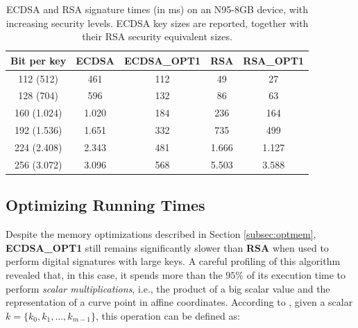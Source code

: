 \documentclass[authoryear]{elsarticle}
\begin{document}

\begin{table}[ht]
\caption{ECDSA and RSA signature times (in ms) on an N95-8GB device, with increasing security levels. ECDSA key sizes are reported, together with their RSA security equivalent sizes.}
\centering %
\begin{tabular}{|c|c|c|c|c|} %
\hline\hline %
Bit per key & ECDSA & ECDSA\_OPT1 & RSA & RSA\_OPT1\\
\hline\hline %
112 (512) & 461 & 112 & 49 & 27      \\
128 (704) & 596	& 132 & 86 & 63      \\
160 (1.024) & 1.020 & 184 & 236 & 164   \\
192 (1.536) & 1.651 & 332 & 735 & 499   \\
224 (2.408) & 2.343 & 481 & 1.666 & 1.127 \\
256 (3.072) & 3.096 & 568 & 5.503 & 3.588 \\ %
\hline %
\end{tabular}
\label{table:BCJ2SE-BigVSJ2SEBIG} %
\end{table}





\subsection{Optimizing Running Times}
\label{Speedup}
Despite the memory optimizations described in Section \ref{subsec:optmem}, \textbf{ECDSA\_OPT1} still remains significantly slower than \textbf{RSA} when used to perform digital signatures with large keys. A careful profiling of this algorithm revealed that, in this case, it spends more than the $95\%$ of its execution time to perform \emph{scalar multiplications}, i.e., the product of a big scalar value and the representation of a curve point in affine coordinates. According to \citet{Menezes}, given  a scalar $k = \{k_0, k_1, \ldots, k_{m-1}\}$, this operation can be defined as:
\end{document}
